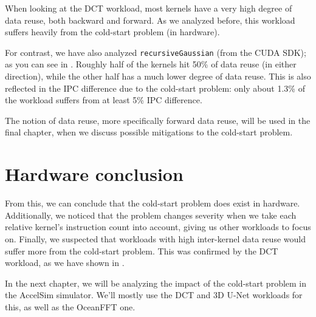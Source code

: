 When looking at the DCT workload, most kernels have a very high degree of data reuse, both backward and forward.
As we analyzed before, this workload suffers heavily from the cold-start problem (in hardware).

For contrast, we have also analyzed \verb|recursiveGaussian| (from the CUDA SDK); as you can see in .
Roughly half of the kernels hit 50\% of data reuse (in either direction), while the other half has a much lower degree of data reuse.
This is also reflected in the IPC difference due to the cold-start problem: only about 1.3\% of the workload suffers from at least 5\% IPC difference.

The notion of data reuse, more specifically forward data reuse, will be used in the final chapter, when we discuss possible mitigations to the cold-start problem.

\FloatBarrier
\section{Hardware conclusion}\label{sec:hw-conclusion}
From this, we can conclude that the cold-start problem does exist in hardware.
Additionally, we noticed that the problem changes severity when we take each relative kernel's instruction count into account, giving us other workloads to focus on.
Finally, we suspected that workloads with high inter-kernel data reuse would suffer more from the cold-start problem.
This was confirmed by the DCT workload, as we have shown in .

In the next chapter, we will be analyzing the impact of the cold-start problem in the AccelSim simulator.
We'll mostly use the DCT and 3D U-Net workloads for this, as well as the OceanFFT one.
